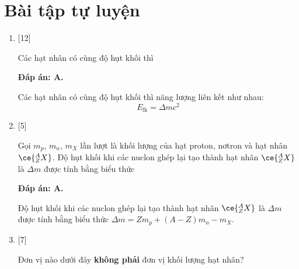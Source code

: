\section{Bài tập tự luyện}
\begin{enumerate}[label=\bfseries Câu \arabic*:]
	\item {} [12]
	\cauhoi
	{Các hạt nhân có cùng độ hụt khối thì
	}
	
	\loigiai
	{		\textbf{Đáp án: A.}
		
		Các hạt nhân có cùng độ hụt khối thì năng lượng liên kết như nhau:
		$$E_\text{lk} = \Delta m c^2$$
		
	}
	
	\item {} [5]
	\cauhoi
	{Gọi $m_p$, $m_n$, $m_X$ lần lượt là khối lượng của hạt proton, nơtron và hạt nhân $\ce{^A_Z X}$. Độ hụt khối khi các nuclon ghép lại tạo thành hạt nhân $\ce{^A_Z X}$ là $\Delta m$ được tính bằng biểu thức
	}
	
	\loigiai
	{		\textbf{Đáp án: A.}
		
		Độ hụt khối khi các nuclon ghép lại tạo thành hạt nhân $\ce{^A_Z X}$ là $\Delta m$ được tính bằng biểu thức $\Delta m = Z m_p + (A-Z) m_n - m_X$. 
		
	}
	\item {} [7]
	\cauhoi
	{Đơn vị nào dưới đây \textbf{không phải} đơn vị khối lượng hạt nhân?
	}
	

\end{enumerate}
